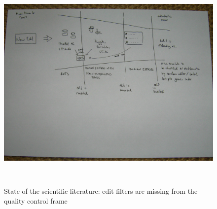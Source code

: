 \begin{figure}
\centering
  \includegraphics[width=0.9\columnwidth]{pics/funnel-diagramm-no-filters.JPG}
  \caption{State of the scientific literature: edit filters are missing from the quality control frame}~\label{fig:funnel-no-filters}
\end{figure}

